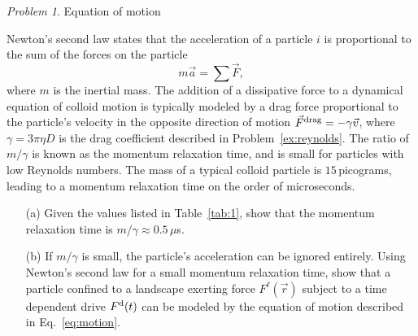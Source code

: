 \documentclass[preprint,showpacs,preprintnumbers,amsmath,amssymb,aps,prb]{revtex4-1}
\theoremstyle{remark}
\newtheorem{problem}{Problem}
\begin{document}
\begin{problem}{Equation of motion}
  \label{ex:n2l}

\noindent Newton's second law states that
  the acceleration of a particle $i$
  is proportional to 
  the sum of the forces on the particle 
  \begin{equation}
  m \vec{a} = \sum \vec{F},
  \label{eq:n2l}
  \end{equation}
  where $m$ is the
  inertial mass.  
  The addition of a dissipative force to a dynamical equation 
  of colloid motion 
  is typically modeled
  by a drag force proportional to the particle's velocity
  in the opposite direction of motion 
  $\vec{F}^{\rm drag} = - \gamma \vec{v}$,
  where $\gamma = 3 \pi \eta D$ is the drag coefficient
  described in Problem~\ref{ex:reynolds}.
  The ratio of $m/\gamma$ is 
  known as the momentum relaxation time,
  and is small for
  particles with low Reynolds numbers.
  The mass of a
  typical colloid particle is $15$\,picograms,
  leading to a momentum relaxation time
  on the order of microseconds.

\begin{enumerate}

\item [(a)] Given  the values listed in Table~\ref{tab:1},
 show that  the momentum relaxation time is 
  $m/\gamma \approx 0.5\,\mu$s. 
  
\item [(b)] If $m/\gamma$ is small, the
  particle's acceleration can be ignored
  entirely.
Using Newton's second law for
  a small momentum relaxation time, 
  show that a particle confined to a landscape exerting force
  $F^\ell(\vec{r})$ subject to a time dependent drive $F^{\rm d}(t)$
  can be modeled by the equation of motion described in 
  Eq.~\eqref{eq:motion}.
  \end{enumerate}
\end{problem}
\end{document}
